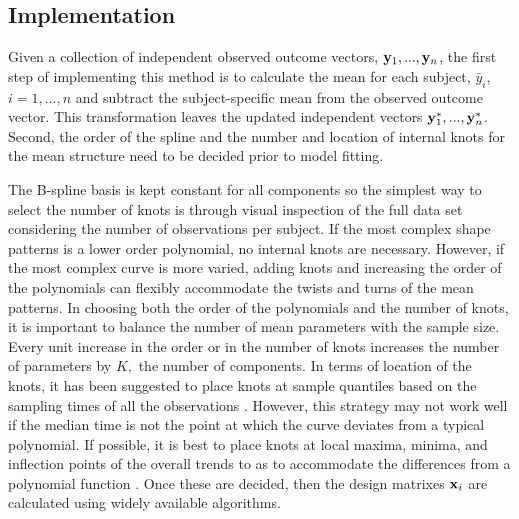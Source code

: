 \subsection{Implementation}
Given a collection of independent observed outcome vectors, $\mathbf y_{1},...,\mathbf y_{n}$, the first step of implementing this method is to calculate the mean for each subject, $\bar{y}_{i}$, $i=1,...,n$ and subtract the subject-specific mean from the observed outcome vector. This transformation leaves the updated independent vectors $\mathbf y^{*}_{1},...,\mathbf y^{*}_{n}$. Second, the order of the spline and the number and location of internal knots for the mean structure need to be decided prior to model fitting. 

The B-spline basis is kept constant for all components so the simplest way to select the number of knots is through visual inspection of the full data set considering the number of observations per subject. If the most complex shape patterns is a lower order polynomial, no internal knots are necessary. However, if the most complex curve is more varied, adding knots and increasing the order of the polynomials can flexibly accommodate the twists and turns of the mean patterns. In choosing both the order of the polynomials and the number of knots, it is important to balance the number of mean parameters with the sample size. Every unit increase in the order or in the number of knots increases the number of parameters by $K,$ the number of components. In terms of location of the knots, it has been suggested to place knots at sample quantiles based on the sampling times of all the observations \cite{ruppert2002}. However, this strategy may not work well if the median time is not the point at which the curve deviates from a typical polynomial. If possible, it is best to place knots at local maxima, minima, and inflection points of the overall trends to as to accommodate the differences from a polynomial function \cite{eubank1999}.  Once these are decided, then the design matrixes $\mathbf x_{i}$ are calculated using widely available algorithms. 

